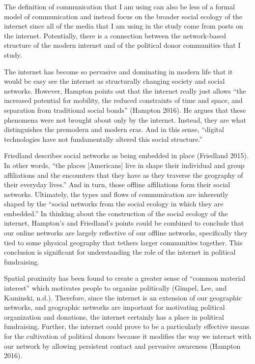 \documentclass[12pt,]{article}
\begin{document}
The definition of communication that I am using can also be less of a
formal model of communication and instead focus on the broader social
ecology of the internet since all of the media that I am using in the
study come from posts on the internet. Potentially, there is a
connection between the network-based structure of the modern internet
and of the political donor communities that I study.

The internet has become so pervasive and dominating in modern life that
it would be easy see the internet as structurally changing society and
social networks. However, Hampton points out that the internet really
just allows ``the increased potential for mobility, the reduced
constraints of time and space, and separation from traditional social
bonds'' (Hampton 2016). He argues that these phenomena were not brought
about only by the internet. Instead, they are what distinguishes the
premodern and modern eras. And in this sense, ``digital technologies
have not fundamentally altered this social structure.''

Friedland describes social networks as being embedded in place
(Friedland 2015). In other words, ``the places {[}Americans{]} live in
shape their individual and group affiliations and the encounters that
they have as they traverse the geography of their everyday lives.'' And
in turn, those offline affiliations form their social networks.
Ultimately, the types and flows of communication are inherently shaped
by the ``social networks from the social ecology in which they are
embedded.'' In thinking about the construction of the social ecology of
the internet, Hampton's and Friedland's points could be combined to
conclude that our online networks are largely reflective of our offline
networks, specifically they tied to some physical geography that tethers
larger communities together. This conclusion is significant for
understanding the role of the internet in political fundraising.

Spatial proximity has been found to create a greater sense of ``common
material interest'' which motivates people to organize politically
(Gimpel, Lee, and Kaminski, n.d.). Therefore, since the internet is an
extension of our geographic networks, and geographic networks are
important for motivating political organization and donations, the
internet certainly has a place in political fundraising. Further, the
internet could prove to be a particularly effective means for the
cultivation of political donors because it modifies the way we interact
with our network by allowing persistent contact and pervasive awareness
(Hampton 2016).
\end{document}
